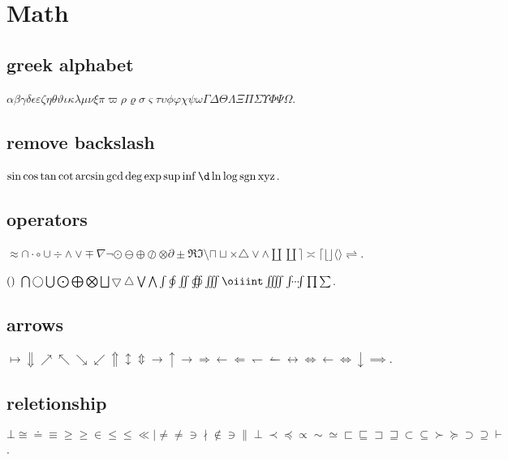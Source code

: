 \documentclass{ctexbook}
\DeclareMathOperator{\sgn}{sgn}
\begin{document}
\section{Math}
\subsection{greek alphabet}
\(\alpha\beta\gamma\delta\epsilon\varepsilon\zeta\eta\theta\vartheta\iota\kappa\lambda\mu\nu\xi\pi\varpi\rho\varrho\sigma\varsigma\tau\upsilon\phi\varphi\chi\psi\omega\Gamma\Delta\Theta\Lambda\Xi\Pi\Sigma\Upsilon\Phi\Psi\Omega\).

\subsection{remove backslash}
\(\sin \cos \tan \cot \arcsin \gcd \deg \exp \sup \inf \d \ln \log \sgn \operatorname{xyz}\).

\subsection{operators}
\(\approx \cap \cdot \circ \cup \div \land \lor \mp \nabla \neg \odot \ominus \oplus \oslash \otimes \partial \pm \Re \Im \setminus \sqcap \sqcup \times \triangle \vee \wedge \amalg \coprod \rceil \asymp \lceil \lfloor \rfloor \langle \rangle \rightleftharpoons \).

\(\mleft( \mright)\)
\(\bigcap \bigcirc \bigcup \bigodot \bigoplus \bigotimes \bigsqcup \bigtriangledown \bigtriangleup \bigvee \bigwedge \int \oint \iint \oiint \iiint \oiiint \iiiint \idotsint \prod \sum \).

\subsection{arrows}
\(\mapsto \Downarrow \nearrow \nwarrow \searrow \swarrow \Uparrow \updownarrow \Updownarrow \to \uparrow \rightarrow \Rightarrow \leftarrow \Leftarrow \leftharpoondown \leftharpoonup \leftrightarrow \Leftrightarrow \gets \iff \downarrow \implies\).

\subsection{reletionship}
\(\bot \cong \doteq \equiv \ge \geq \in \le \leq \ll \mid \ne \neq \ni \nmid \notin \owns \parallel \perp \prec \preceq \propto \sim \simeq \sqsubset \sqsubseteq \sqsupset \sqsupseteq \subset \subseteq \succ \succeq \supset \supseteq \vdash \).
\end{document}
